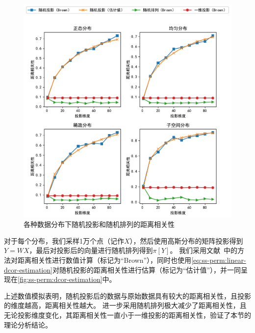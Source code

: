 \begin{figure}[h!]
    \centering
    \includegraphics[width=\linewidth]{Z_Resources/ss-perm_dcor-estimation}
    \caption{各种数据分布下随机投影和随机排列的距离相关性}
    \label{fig:ss-perm:dcor-estimation}
\end{figure}


对于每个分布，我们采样1万个点（记作$X$），然后使用高斯分布的矩阵投影得到$Y = WX$，最后对投影后的向量进行随机排列得到$\pi[Y]$。
%
我们采用文献~\cite{szekely2009brownian_dcor}中的方法对距离相关性进行数值计算（标记为“Brown”），同时也使用\autoref{eq:ss-perm:linear-dcor-estimation}对随机投影的距离相关性进行估算（标记为“估计值”），并一同呈现在\autoref{fig:ss-perm:dcor-estimation}中。
%


上述数值模拟表明，随机投影后的数据与原始数据具有较大的距离相关性，且投影的维度越高，距离相关性越大。
%
进一步采用随机排列极大减少了距离相关性，且无论投影维度变化，其距离相关性一直小于一维投影的距离相关性，验证了本节的理论分析结论。